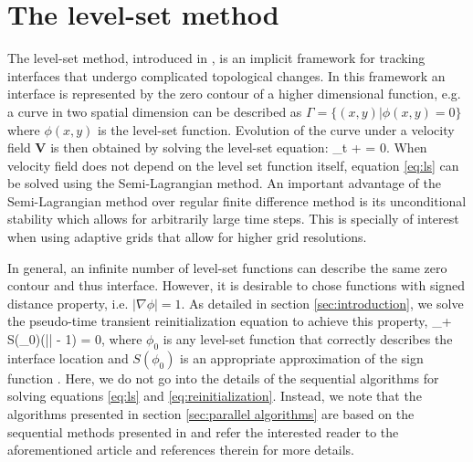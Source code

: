 \section{The level-set method}\label{sec:levelset method}
The level-set method, introduced in \cite{Osher;Sethian:88:Fronts-Propagating-w}, is an implicit framework for tracking interfaces that undergo complicated topological changes. In this framework an interface is represented by the zero contour of a higher dimensional function, e.g. a curve in two spatial dimension can be described as $\Gamma = \{(x,y) | \phi(x,y) = 0\}$ where $\phi(x,y)$ is the level-set function. Evolution of the curve under a velocity field $\mathbf{V}$ is then obtained by solving the level-set equation:
\be
\phi_t +  \cdot \nabla \phi = 0.
\label{eq:ls}
\ee
When velocity field does not depend on the level set function itself, equation \eqref{eq:ls} can be solved using the Semi-Lagrangian method. An important advantage of the Semi-Lagrangian method over regular finite difference method is its unconditional stability which allows for arbitrarily large time steps. This is specially of interest when using adaptive grids that allow for higher grid resolutions.

In general, an infinite number of level-set functions can describe the same zero contour and thus interface. However, it is desirable to chose functions with signed distance property, i.e. $|\nabla \phi| = 1$. As detailed in section \ref{sec:introduction}, we solve the pseudo-time transient reinitialization equation \cite{Sussman;Smereka;Osher:94:A-Level-Set-Approach, Osher;Fedkiw:01:Level-Set-Methods:-A} to achieve this property,
\be
\phi_\tau + S(\phi_0)\left(|\nabla \phi| - 1\right) = 0,
\label{eq:reinitialization}
\ee
where $\phi_0$ is any level-set function that correctly describes the interface location and $S(\phi_0)$ is an appropriate approximation of the sign function \cite{Osher;Fedkiw:02:Level-Set-Methods-an}. Here, we do not go into the details of the sequential algorithms for solving equations \eqref{eq:ls} and \eqref{eq:reinitialization}. Instead, we note that the algorithms presented in section \ref{sec:parallel algorithms} are based on the sequential methods presented in \cite{Min;Gibou:07:A-second-order-accur} and refer the interested reader to the aforementioned article and references therein for more details.


